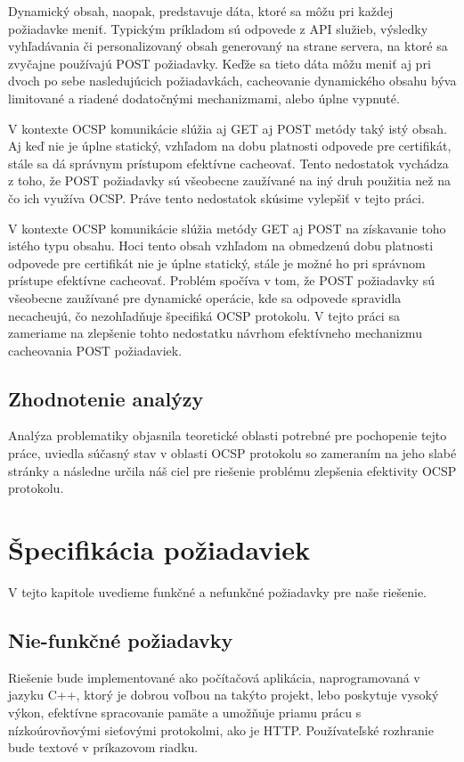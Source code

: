\documentclass[12pt, twoside]{book}
\begin{document}
Dynamický obsah, naopak, predstavuje dáta, ktoré sa môžu pri každej požiadavke meniť. Typickým príkladom sú odpovede z API služieb, výsledky vyhľadávania či personalizovaný obsah generovaný na strane servera, na ktoré sa zvyčajne používajú POST požiadavky. Keďže sa tieto dáta môžu meniť aj pri dvoch po sebe nasledujúcich požiadavkách, cacheovanie dynamického obsahu býva limitované a riadené dodatočnými mechanizmami, alebo úplne vypnuté.

V kontexte OCSP komunikácie slúžia aj GET aj POST metódy taký istý obsah. Aj keď nie je úplne statický, vzhľadom na dobu platnosti odpovede pre certifikát, stále sa dá správnym prístupom efektívne cacheovať. Tento nedostatok vychádza z toho, že POST požiadavky sú všeobecne zaužívané na iný druh použitia než na čo ich využíva OCSP. Práve tento nedostatok skúsime vylepšiť v tejto práci.

V kontexte OCSP komunikácie slúžia metódy GET aj POST na získavanie toho istého typu obsahu. Hoci tento obsah vzhľadom na obmedzenú dobu platnosti odpovede pre certifikát nie je úplne statický, stále je možné ho pri správnom prístupe efektívne cacheovať. Problém spočíva v tom, že POST požiadavky sú všeobecne zaužívané pre dynamické operácie, kde sa odpovede spravidla necacheujú, čo nezohľadňuje špecifiká OCSP protokolu. V tejto práci sa zameriame na zlepšenie tohto nedostatku návrhom efektívneho mechanizmu cacheovania POST požiadaviek.


\subsection{Zhodnotenie analýzy}
Analýza problematiky objasnila teoretické oblasti potrebné pre pochopenie tejto práce, uviedla súčasný stav v oblasti OCSP protokolu so zameraním na jeho slabé stránky a následne určila náš ciel pre riešenie problému zlepšenia efektivity OCSP protokolu.



\section{Špecifikácia požiadaviek}
V tejto kapitole uvedieme funkčné a nefunkčné požiadavky pre naše riešenie.

\subsection{Nie-funkčné požiadavky}
Riešenie bude implementované ako počítačová aplikácia, naprogramovaná v jazyku C++, ktorý je dobrou voľbou na takýto projekt, lebo poskytuje vysoký výkon, efektívne spracovanie pamäte a umožňuje priamu prácu s nízkoúrovňovými sieťovými protokolmi, ako je HTTP.
Používateľské rozhranie bude textové v príkazovom riadku.
\end{document}
